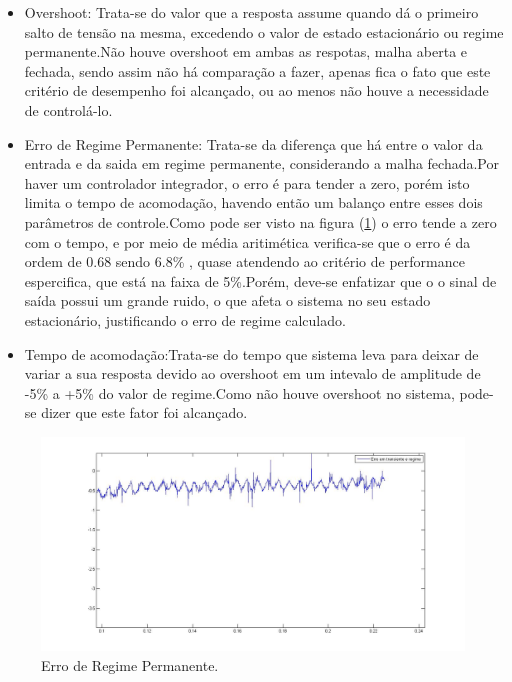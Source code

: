 \documentclass[11pt, a4paper, oneside]{article}
\begin{document}
  \begin{itemize}  

        \item Overshoot: Trata-se do valor que a resposta assume quando dá o primeiro salto de tensão na mesma, excedendo o valor de estado estacionário ou regime permanente.Não houve overshoot em ambas as respotas, malha aberta e fechada, sendo assim não há comparação a fazer, apenas fica o fato que este critério de desempenho foi alcançado, ou ao menos não houve a necessidade de controlá-lo.

        \item Erro de Regime Permanente: Trata-se da diferença que há entre o valor da entrada e da saida em regime permanente, considerando a malha fechada.Por haver um controlador integrador, o erro é para tender a zero, porém isto limita o tempo de acomodação, havendo então um balanço entre esses dois parâmetros de controle.Como pode ser visto na figura (\ref{erro_regime}) o erro tende a zero com o tempo, e por meio de média aritimética verifica-se que o erro é da ordem de 0.68 sendo 6.8\% , quase atendendo ao critério de performance espercifica, que está na faixa de 5\%.Porém, deve-se enfatizar que o o sinal de saída possui um grande ruido, o que afeta o sistema no seu estado estacionário, justificando o erro de regime calculado. 
        
        \item  Tempo de acomodação:Trata-se do tempo que sistema leva para deixar de variar a sua resposta devido ao overshoot em um intevalo de amplitude de -5\% a +5\% do valor de regime.Como não houve overshoot no sistema, pode-se dizer que este fator foi alcançado. 
 
    \end{itemize}
               
\begin{figure}[h!]
\centering
\includegraphics[width=\linewidth]{Erro_de_regime_permanente.jpg}
\caption{Erro de Regime Permanente.}	
\label{erro_regime}
\end{figure}
\end{document}
